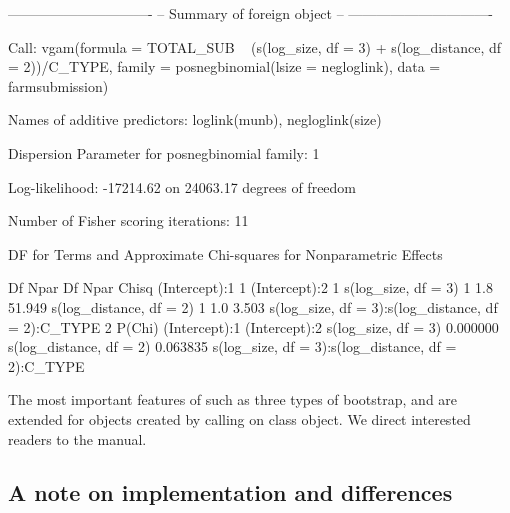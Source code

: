 \documentclass[
]{jss}
\newcommand{\1}{\mathcal{I}} \newcommand{\bZero}{\boldsymbol{0}}
\begin{document}
\begin{CodeChunk}
\begin{CodeOutput}
-------------------------------
-- Summary of foreign object --
-------------------------------

Call:
vgam(formula = TOTAL_SUB ~ (s(log_size, df = 3) + s(log_distance, 
    df = 2))/C_TYPE, family = posnegbinomial(lsize = negloglink), 
    data = farmsubmission)

Names of additive predictors: loglink(munb), negloglink(size)

Dispersion Parameter for posnegbinomial family:   1

Log-likelihood: -17214.62 on 24063.17 degrees of freedom

Number of Fisher scoring iterations:  11 

DF for Terms and Approximate Chi-squares for Nonparametric Effects

                                                   Df Npar Df Npar Chisq
(Intercept):1                                       1                   
(Intercept):2                                       1                   
s(log_size, df = 3)                                 1     1.8     51.949
s(log_distance, df = 2)                             1     1.0      3.503
s(log_size, df = 3):s(log_distance, df = 2):C_TYPE  2                   
                                                     P(Chi)
(Intercept):1                                              
(Intercept):2                                              
s(log_size, df = 3)                                0.000000
s(log_distance, df = 2)                            0.063835
s(log_size, df = 3):s(log_distance, df = 2):C_TYPE         
\end{CodeOutput}
\end{CodeChunk}

\normalsize

The most important features of  such as three types
of bootstrap,  and  are extended
for objects created by calling  on
 class object. We direct interested readers
to the manual.

\subsection{A note on implementation and
differences}\label{a-note-on-implementation-and-differences}
\end{document}
